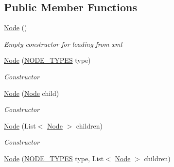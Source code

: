 \subsection*{Public Member Functions}
\begin{DoxyCompactItemize}
\item 
\hyperlink{class_web_analyzer_1_1_models_1_1_settings_model_1_1_expression_tree_1_1_node_af25a40f1b18460d7bee03021e19335fb}{Node} ()
\begin{DoxyCompactList}\small\item\em Empty constructor for loading from xml \end{DoxyCompactList}\item 
\hyperlink{class_web_analyzer_1_1_models_1_1_settings_model_1_1_expression_tree_1_1_node_a10c868b90b509e4355a2d9c9b7b34968}{Node} (\hyperlink{class_web_analyzer_1_1_models_1_1_settings_model_1_1_expression_tree_1_1_node_a89c72b19ff778cbc04788f4cb47a730e}{N\+O\+D\+E\+\_\+\+T\+Y\+P\+E\+S} type)
\begin{DoxyCompactList}\small\item\em Constructor \end{DoxyCompactList}\item 
\hyperlink{class_web_analyzer_1_1_models_1_1_settings_model_1_1_expression_tree_1_1_node_a5ac174eb5648c594f80c5ca3e74a6687}{Node} (\hyperlink{class_web_analyzer_1_1_models_1_1_settings_model_1_1_expression_tree_1_1_node}{Node} child)
\begin{DoxyCompactList}\small\item\em Constructor \end{DoxyCompactList}\item 
\hyperlink{class_web_analyzer_1_1_models_1_1_settings_model_1_1_expression_tree_1_1_node_a8f431fec0565dbc38cf63b8c469ff9b6}{Node} (List$<$ \hyperlink{class_web_analyzer_1_1_models_1_1_settings_model_1_1_expression_tree_1_1_node}{Node} $>$ children)
\begin{DoxyCompactList}\small\item\em Constructor \end{DoxyCompactList}\item 
\hyperlink{class_web_analyzer_1_1_models_1_1_settings_model_1_1_expression_tree_1_1_node_a499c9647efddf11d1fe3bd3c8759e5d3}{Node} (\hyperlink{class_web_analyzer_1_1_models_1_1_settings_model_1_1_expression_tree_1_1_node_a89c72b19ff778cbc04788f4cb47a730e}{N\+O\+D\+E\+\_\+\+T\+Y\+P\+E\+S} type, List$<$ \hyperlink{class_web_analyzer_1_1_models_1_1_settings_model_1_1_expression_tree_1_1_node}{Node} $>$ children)

\end{DoxyCompactItemize}
